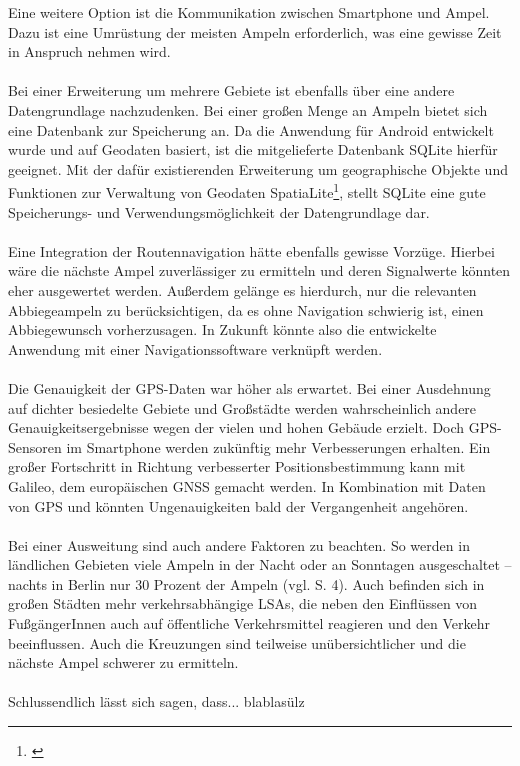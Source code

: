 Eine weitere Option ist die Kommunikation zwischen \gls{Smartphone} und Ampel. Dazu ist eine Umrüstung der meisten Ampeln erforderlich, was eine gewisse Zeit in Anspruch nehmen wird. \cite{smart_lsa}\\\\
Bei einer Erweiterung um mehrere Gebiete ist ebenfalls über eine andere Datengrundlage nachzudenken. Bei einer großen Menge an Ampeln bietet sich eine Datenbank zur Speicherung an.
Da die Anwendung für Android entwickelt wurde und auf Geodaten basiert, ist die mitgelieferte Datenbank SQLite hierfür geeignet. Mit der dafür existierenden Erweiterung um geographische Objekte und Funktionen zur Verwaltung von Geodaten SpatiaLite\footnote{\cite{sparta}}, stellt SQLite eine gute Speicherungs- und Verwendungsmöglichkeit der Datengrundlage dar.\\\\
Eine Integration der Routennavigation hätte ebenfalls gewisse Vorzüge. Hierbei wäre die nächste Ampel zuverlässiger zu ermitteln und deren Signalwerte könnten eher ausgewertet werden. Außerdem gelänge es hierdurch, nur die relevanten Abbiegeampeln zu berücksichtigen, da es ohne Navigation schwierig ist, einen Abbiegewunsch vorherzusagen. In Zukunft könnte also die entwickelte Anwendung mit einer Navigationssoftware verknüpft werden.\\\\
Die Genauigkeit der \gls{GPS}-Daten war höher als erwartet. Bei einer Ausdehnung auf dichter besiedelte Gebiete und Großstädte werden wahrscheinlich andere Genauigkeitsergebnisse wegen der vielen und hohen Gebäude erzielt. Doch \gls{GPS}-Sensoren im \gls{Smartphone} werden zukünftig mehr Verbesserungen erhalten. 
Ein großer Fortschritt in Richtung verbesserter Positionsbestimmung kann mit Galileo, dem europäischen \gls{GNSS} gemacht werden. In Kombination mit Daten von \gls{GPS} und  könnten Ungenauigkeiten bald der Vergangenheit angehören. \cite{gnss}\\\\
Bei einer Ausweitung sind auch andere Faktoren zu beachten. So werden in ländlichen Gebieten viele Ampeln in der Nacht oder an Sonntagen ausgeschaltet -- nachts in Berlin nur 30 Prozent der Ampeln (vgl. \cite{lsa_bln} S. 4). Auch befinden sich in großen Städten mehr verkehrsabhängige \glspl{LSA}, die neben den Einflüssen von FußgängerInnen auch auf öffentliche Verkehrsmittel reagieren und den Verkehr beeinflussen. Auch die Kreuzungen sind teilweise unübersichtlicher und die nächste Ampel schwerer zu ermitteln.\\\\
Schlussendlich lässt sich sagen, dass... blablasülz
